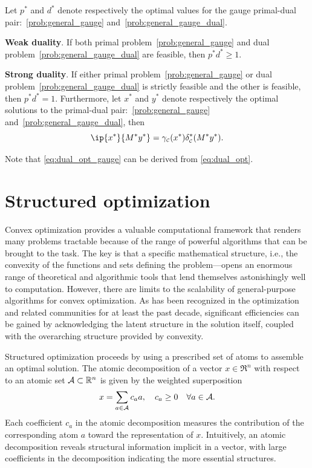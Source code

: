 \begin{theorem} 
    Let $p^*$ and $d^*$ denote respectively the optimal values for the gauge primal-dual pair:~\eqref{prob:general_gauge} and~\eqref{prob:general_gauge_dual}. 
    \item \textbf{Weak duality}. If both primal problem~\eqref{prob:general_gauge} and dual problem~\eqref{prob:general_gauge_dual} are feasible, then $p^* d^* \geq 1$. 
    \item \textbf{Strong duality}. If either primal problem~\eqref{prob:general_gauge} or dual problem~\eqref{prob:general_gauge_dual} is strictly feasible and the other is feasible, then $p^* d^* = 1$. Furthermore, let $x^*$ and $y^*$ denote respectively the optimal solutions to the primal-dual pair:~\eqref{prob:general_gauge} and~\eqref{prob:general_gauge_dual}, then 
    \begin{equation} \label{eq:dual_opt_gauge}
        \ip{x^*}{M^*y^*} = \gauge\Cs(x^*)\delta\Cs^*(M^*y^*).
    \end{equation}    
\end{theorem}
Note that \eqref{eq:dual_opt_gauge} can be derived from \eqref{eq:dual_opt}.

\section{Structured optimization} \label{sec:1-3}

Convex optimization provides a valuable computational framework that renders many problems tractable because of the range of powerful algorithms that can be brought to the task. The key is that a specific mathematical structure, i.e., the convexity of the functions and sets defining the problem—opens an enormous range of theoretical and algorithmic tools that lend themselves astonishingly well to computation. However, there are limits to the scalability of general-purpose algorithms for convex optimization. As has been recognized in the optimization and related communities for at least the past decade, significant efficiencies can be gained by acknowledging the latent structure in the solution itself, coupled with the overarching structure provided by convexity.

Structured optimization proceeds by using a prescribed set of atoms to assemble an optimal solution. The atomic decomposition of a vector $x\in\Re^n$ with respect to an atomic set
$\mathcal{A}\subset\mathbb{R}^n$ is given by the weighted superposition
\begin{equation} \label{eq:atomic-decomp}
  x = \sum_{a\in\mathcal{A}} c_a a, \quad c_a\ge0 \quad \forall a\in\mathcal{A}.
\end{equation}
Each coefficient $c_a$ in the atomic decomposition measures the contribution of
the corresponding atom $a$ toward the representation of $x$. Intuitively, an
atomic decomposition reveals structural information implicit in a vector, with
large coefficients in the decomposition indicating the more essential
structures.

